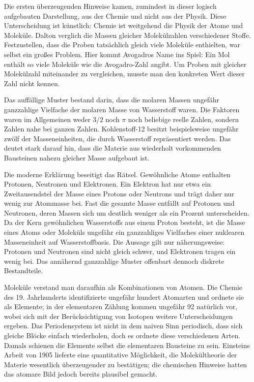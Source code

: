 Die ersten überzeugenden Hinweise kamen, zumindest in dieser logisch aufgebauten Darstellung, aus der Chemie und nicht aus der Physik. Diese Unterscheidung ist künstlich: Chemie ist weitgehend die Physik der Atome und Moleküle. Dalton verglich die Massen gleicher Molekülzahlen verschiedener Stoffe. Festzustellen, dass die Proben tatsächlich gleich viele Moleküle enthielten, war selbst ein großes Problem. Hier kommt Avogadros Name ins Spiel: Ein Mol enthält so viele Moleküle wie die Avogadro-Zahl angibt. Um Proben mit gleicher Molekülzahl miteinander zu vergleichen, musste man den konkreten Wert dieser Zahl nicht kennen.

Das auffällige Muster bestand darin, dass die molaren Massen ungefähr ganzzahlige Vielfache der molaren Masse von Wasserstoff waren. Die Faktoren waren im Allgemeinen weder \(3/2\) noch \(\pi\) noch beliebige reelle Zahlen, sondern Zahlen nahe bei ganzen Zahlen. Kohlenstoff-12 besitzt beispielsweise ungefähr zwölf der Masseneinheiten, die durch Wasserstoff repräsentiert werden. Das deutet stark darauf hin, dass die Materie aus wiederholt vorkommenden Bausteinen nahezu gleicher Masse aufgebaut ist.

Die moderne Erklärung beseitigt das Rätsel. Gewöhnliche Atome enthalten Protonen, Neutronen und Elektronen. Ein Elektron hat nur etwa ein Zweitausendstel der Masse eines Protons oder Neutrons und trägt daher nur wenig zur Atommasse bei. Fast die gesamte Masse entfällt auf Protonen und Neutronen, deren Massen sich um deutlich weniger als ein Prozent unterscheiden. Da der Kern gewöhnlichen Wasserstoffs aus einem Proton besteht, ist die Masse eines Atoms oder Moleküls ungefähr ein ganzzahliges Vielfaches einer nuklearen Masseneinheit auf Wasserstoffbasis. Die Aussage gilt nur näherungsweise: Protonen und Neutronen sind nicht gleich schwer, und Elektronen tragen ein wenig bei. Das annähernd ganzzahlige Muster offenbart dennoch diskrete Bestandteile.

Moleküle verstand man daraufhin als Kombinationen von Atomen. Die Chemie des 19. Jahrhunderts identifizierte ungefähr hundert Atomarten und ordnete sie als Elemente; in der elementaren Zählung kommen ungefähr 92 natürlich vor, wobei sich mit der Berücksichtigung von Isotopen weitere Unterscheidungen ergeben. Das Periodensystem ist nicht in dem naiven Sinn periodisch, dass sich gleiche Blöcke einfach wiederholen, doch es ordnete diese verschiedenen Arten. Damals schienen die Elemente selbst die elementaren Bausteine zu sein. Einsteins Arbeit von 1905 lieferte eine quantitative Möglichkeit, die Molekültheorie der Materie wesentlich überzeugender zu bestätigen; die chemischen Hinweise hatten das atomare Bild jedoch bereits plausibel gemacht.

